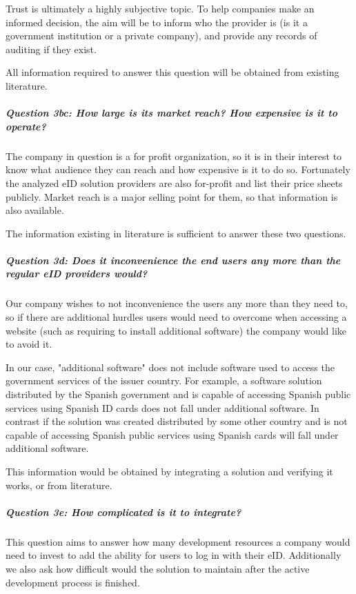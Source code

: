 Trust is ultimately a highly subjective topic. To help companies make an informed decision, the aim will be to inform who the provider is (is it a government institution or a private company), and provide any records of auditing if they exist.

All information required to answer this question will be obtained from existing literature.

\subparagraph{Question 3bc: How large is its market reach? How expensive is it to operate?}\noindent

The company in question is a for profit organization, so it is in their interest to know what audience they can reach and how expensive is it to do so. Fortunately the analyzed eID solution providers are also for-profit and list their price sheets publicly. Market reach is a major selling point for them, so that information is also available.

The information existing in literature is sufficient to answer these two questions.

\subparagraph{Question 3d: Does it inconvenience the end users any more than the regular eID providers would?}\noindent

Our company wishes to not inconvenience the users any more than they need to, so if there are additional hurdles users would need to overcome when accessing a website (such as requiring to install additional software) the company would like to avoid it.

In our case, "additional software" does not include software used to access the government services of the issuer country. For example, a software solution distributed by the Spanish government and is capable of accessing Spanish public services using Spanish ID cards does not fall under additional software. In contrast if the solution was created distributed by some other country and is not capable of accessing Spanish public services using Spanish cards will fall under additional software.

This information would be obtained by integrating a solution and verifying it works, or from literature.

\subparagraph{Question 3e: How complicated is it to integrate?}\noindent

This question aims to answer how many development resources a company would need to invest to add the ability for users to log in with their eID. Additionally we also ask how difficult would the solution to maintain after the active development process is finished.

